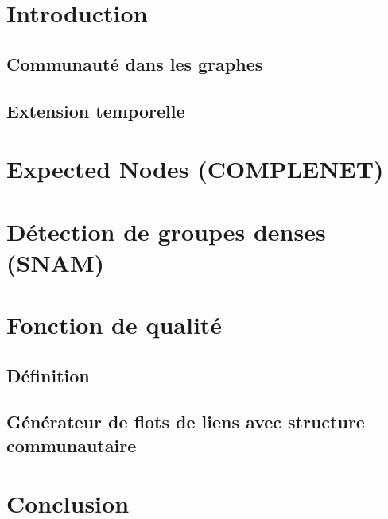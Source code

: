 \chapter{Introduction}
\section{Communauté dans les graphes}
\cite{Fortunato2010}
\section{Extension temporelle}

\chapter{Expected Nodes (COMPLENET)}






\chapter{Détection de groupes denses (SNAM)}



\chapter{Fonction de qualité}
\section{Définition}
\section{Générateur de flots de liens avec structure communautaire}

\chapter{Conclusion}
